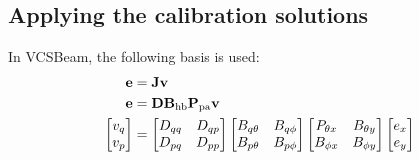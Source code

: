 \documentclass{book}
\newcommand{\vcsbeam}{{\sc VCSBeam}}
\newcommand{\pamat}{\ensuremath{{\bf P}_\text{pa}}}
\begin{document}
\subsection{Applying the calibration solutions}

In \vcsbeam{}, the following basis is used:
\begin{equation}
    \begin{aligned}
        {\bf e} &= {\bf J}{\bf v} \\
        {\bf e} &= {\bf D} {\bf B}_\text{hb} \pamat {\bf v} \\
        \begin{bmatrix} v_q \\ v_p \end{bmatrix}
            &= \begin{bmatrix} D_{qq} & D_{qp} \\ D_{pq} & D_{pp} \end{bmatrix}
               \begin{bmatrix} B_{q\theta} & B_{q\phi} \\ B_{p\theta} & B_{p\phi} \end{bmatrix}
               \begin{bmatrix} P_{\theta x} & B_{\theta y} \\ B_{\phi x} & B_{\phi y} \end{bmatrix}
               \begin{bmatrix} e_x \\ e_y \end{bmatrix}
    \end{aligned}
\end{equation}
\end{document}
